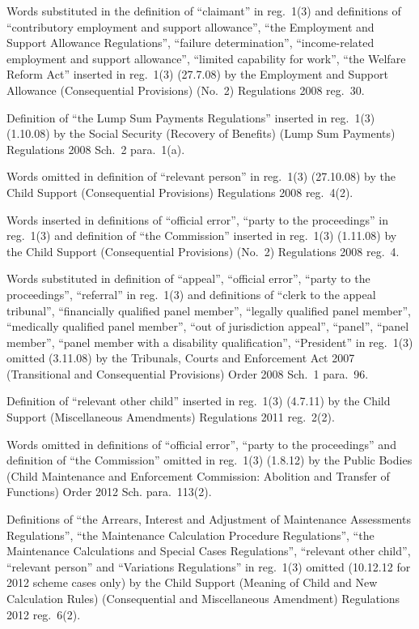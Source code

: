 \documentclass[12pt,a4paper]{article}
\begin{document}
{Words substituted in the definition of ``claimant'' in reg.~1(3) and definitions of ``contributory employment and support allowance'', ``the Employment and Support Allowance Regulations'', ``failure determination'', ``income-related employment and support allowance'', ``limited capability for work'', ``the Welfare Reform Act'' inserted in reg.~1(3) (27.7.08) by the Employment and Support Allowance (Consequential Provisions) (No.~2) Regulations 2008 reg.~30.

Definition of ``the Lump Sum Payments Regulations'' inserted in reg.~1(3) (1.10.08) by the Social Security (Recovery of Benefits) (Lump Sum Payments) Regulations 2008 Sch.~2 para.~1(a).

Words omitted in definition of ``relevant person'' in reg.~1(3) (27.10.08) by the Child Support (Consequential Provisions) Regulations 2008 reg.~4(2).

Words inserted in definitions of ``official error'', ``party to the proceedings'' in reg.~1(3) and definition of ``the Commission'' inserted in reg.~1(3) (1.11.08) by the Child Support (Consequential Provisions) (No.~2) Regulations 2008 reg.~4.

Words substituted in definition of ``appeal'', ``official error'', ``party to the proceedings'', ``referral'' in reg.~1(3) and definitions of ``clerk to the appeal tribunal'', ``financially qualified panel member'', ``legally qualified panel member'', ``medically qualified panel member'', ``out of jurisdiction appeal'', ``panel'', ``panel member'', ``panel member with a disability qualification'', ``President'' in reg.~1(3) omitted (3.11.08) by the Tribunals, Courts and Enforcement Act 2007 (Transitional and Consequential Provisions) Order 2008 Sch.~1 para.~96.

Definition of ``relevant other child'' inserted in reg.~1(3) (4.7.11) by the Child Support (Miscellaneous Amendments) Regulations 2011 reg.~2(2).

Words omitted in definitions of ``official error'', ``party to the proceedings'' and definition of ``the Commission'' omitted in reg.~1(3) (1.8.12) by the Public Bodies (Child Maintenance and Enforcement Commission: Abolition and Transfer of Functions) Order 2012 Sch. para.~113(2).

Definitions of ``the Arrears, Interest and Adjustment of Maintenance Assessments Regulations'', ``the Maintenance Calculation Procedure Regulations'', ``the Maintenance Calculations and Special Cases Regulations'', ``relevant other child'', ``relevant person'' and ``Variations Regulations'' in reg.~1(3) omitted (10.12.12 for 2012 scheme cases only) by the Child Support (Meaning of Child and New Calculation Rules) (Consequential and Miscellaneous Amendment) Regulations 2012 reg.~6(2).
}
\end{document}

